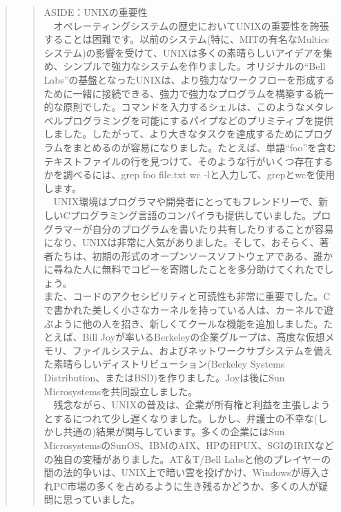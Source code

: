\begin{quote}
\begin{quote}
ASIDE：UNIXの重要性\\
　オペレーティングシステムの歴史においてUNIXの重要性を誇張することは困難です。以前のシステム(特に、MITの有名なMulticsシステム)の影響を受けて、UNIXは多くの素晴らしいアイデアを集め、シンプルで強力なシステムを作りました。オリジナルの``Bell
Labs''の基盤となったUNIXは、より強力なワークフローを形成するために一緒に接続できる、強力で強力なプログラムを構築する統一的な原則でした。コマンドを入力するシェルは、このようなメタレベルプログラミングを可能にするパイプなどのプリミティブを提供しました。したがって、より大きなタスクを達成するためにプログラムをまとめるのが容易になりました。たとえば、単語``foo''を含むテキストファイルの行を見つけて、そのような行がいくつ存在するかを調べるには、grep
foo file.txt \textbar{} wc -lと入力して、grepとwcを使用します。\\
　UNIX環境はプログラマや開発者にとってもフレンドリーで、新しいCプログラミング言語のコンパイラも提供していました。プログラマーが自分のプログラムを書いたり共有したりすることが容易になり、UNIXは非常に人気がありました。そして、おそらく、著者たちは、初期の形式のオープンソースソフトウェアである、誰かに尋ねた人に無料でコピーを寄贈したことを多分助けてくれたでしょう。\\
また、コードのアクセシビリティと可読性も非常に重要でした。Cで書かれた美しく小さなカーネルを持っている人は、カーネルで遊ぶように他の人を招き、新しくてクールな機能を追加しました。たとえば、Bill
Joyが率いるBerkeleyの企業グループは、高度な仮想メモリ、ファイルシステム、およびネットワークサブシステムを備えた素晴らしいディストリビューション(Berkeley
Systems Distribution、またはBSD)を作りました。Joyは後にSun
Microsystemsを共同設立しました。\\
　残念ながら、UNIXの普及は、企業が所有権と利益を主張しようとするにつれて少し遅くなりました。しかし、弁護士の不幸な(しかし共通の)結果が関与しています。多くの企業にはSun
MicrosystemsのSunOS、IBMのAIX、HPのHPUX、SGIのIRIXなどの独自の変種がありました。AT＆T/Bell
Labsと他のプレイヤーの間の法的争いは、UNIX上で暗い雲を投げかけ、Windowsが導入されPC市場の多くを占めるように生き残るかどうか、多くの人が疑問に思っていました。
\end{quote}
\end{quote}

